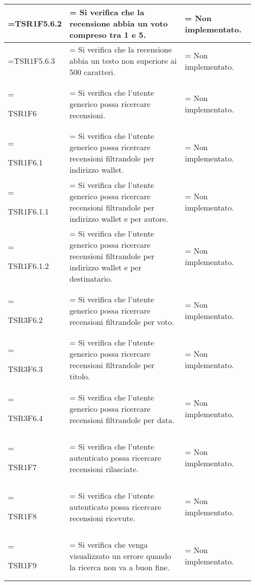 \begin{xltabular}{\textwidth} {
        >{\hsize\linewidth=\hsize}X
        >{\hsize\linewidth=\hsize}X
        >{\hsize\linewidth=\hsize}X
    }
    TSR1F5.6.2&
    Si verifica che la recensione abbia un voto compreso tra 1 e 5.&
    Non implementato.
    \\ \hline

    TSR1F5.6.3&
    Si verifica che la recensione abbia un testo non superiore ai 500 caratteri.&
    Non implementato.
    \\ \hline

    TSR1F6&
    Si verifica che l'utente generico possa ricercare recensioni.&
    Non implementato.
    \\ \hline

    TSR1F6.1&
    Si verifica che l'utente generico possa ricercare recensioni filtrandole per indirizzo wallet.&
    Non implementato.
    \\ \hline
    
    TSR1F6.1.1&
    Si verifica che l'utente generico possa ricercare recensioni filtrandole per indirizzo wallet e per autore.&
    Non implementato.
    \\ \hline
    
    TSR1F6.1.2&
    Si verifica che l'utente generico possa ricercare recensioni filtrandole per indirizzo wallet e per destinatario.&
    Non implementato.
    \\ \hline

    TSR3F6.2&
    Si verifica che l'utente generico possa ricercare recensioni filtrandole per voto.&
    Non implementato.
    \\ \hline
    
    TSR3F6.3&
    Si verifica che l'utente generico possa ricercare recensioni filtrandole per titolo.&
    Non implementato.
    \\ \hline

    TSR3F6.4&
    Si verifica che l'utente generico possa ricercare recensioni filtrandole per data.&
    Non implementato.
    \\ \hline

    TSR1F7&
    Si verifica che l'utente autenticato possa ricercare recensioni rilasciate. &
    Non implementato.
    \\ \hline

    TSR1F8&
    Si verifica che l'utente autenticato possa ricercare recensioni ricevute. &
    Non implementato.
    \\ \hline
    
    TSR1F9&
    Si verifica che venga visualizzato un errore quando la ricerca non va a buon fine. &
    Non implementato.
    \\ \hline


\end{xltabular}
